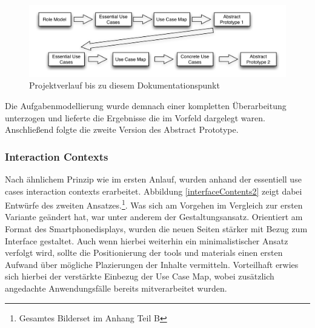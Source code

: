 \begin{figure}[H]
\includegraphics[width=1\textwidth]{./images/position.png}
\caption{Projektverlauf bis zu diesem Dokumentationspunkt}
\label{fig:navigationmap3}
\end{figure}

Die Aufgabenmodellierung wurde demnach einer kompletten Überarbeitung unterzogen und lieferte die Ergebnisse die im Vorfeld dargelegt waren. Anschließend folgte die zweite Version des Abstract Prototype.

\newpage
\subsubsection{Interaction Contexts }
Nach ähnlichem Prinzip wie im ersten Anlauf, wurden anhand der essentiell use cases interaction contexts erarbeitet. Abbildung \ref{interfaceContents2} zeigt dabei Entwürfe des zweiten Ansatzes.\footnote{Gesamtes Bilderset im Anhang Teil B}. Was sich am Vorgehen im Vergleich zur ersten Variante geändert hat, war unter anderem der Gestaltungsansatz. Orientiert am Format des Smartphonedisplays, wurden die neuen Seiten stärker mit Bezug zum Interface gestaltet. Auch wenn hierbei weiterhin ein minimalistischer Ansatz verfolgt wird, sollte die Positionierung der tools und materials einen ersten Aufwand über mögliche Plazierungen der Inhalte vermitteln. Vorteilhaft erwies sich hierbei der verstärkte Einbezug der Use Case Map, wobei zusätzlich angedachte Anwendungsfälle bereits mitverarbeitet wurden.

